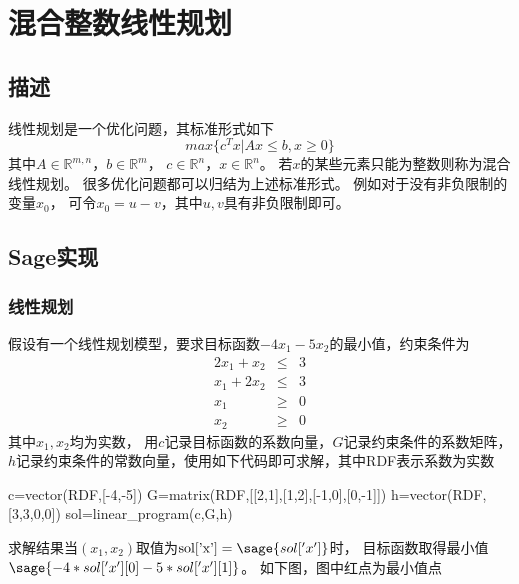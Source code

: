 \section{混合整数线性规划}
\subsection{描述}
线性规划是一个优化问题，其标准形式如下
\[max\{c^Tx|Ax\leq b,x\geq 0\}\]
其中$A\in\mathbb{R}^{m,n}$，$b\in\mathbb{R}^m$，
$c\in\mathbb{R}^n$，$x\in\mathbb{R}^n$。
若$x$的某些元素只能为整数则称为混合线性规划。
很多优化问题都可以归结为上述标准形式。
例如对于没有非负限制的变量$x_0$，
可令$x_0=u-v$，其中$u,v$具有非负限制即可。

\subsection{Sage实现}
\subsubsection{线性规划}
假设有一个线性规划模型，要求目标函数$-4x_1-5x_2$的最小值，约束条件为
\[
\begin{array}{rcl}
2x_1+x_2 &\leq& 3\\
x_1+2x_2 &\leq& 3\\
x_1 &\geq& 0\\
x_2 &\geq& 0
\end{array}
\]
其中$x_1,x_2$均为实数，
用$c$记录目标函数的系数向量，$G$记录约束条件的系数矩阵，
$h$记录约束条件的常数向量，使用如下代码即可求解，其中RDF表示系数为实数
\begin{sageblock}
c=vector(RDF,[-4,-5])
G=matrix(RDF,[[2,1],[1,2],[-1,0],[0,-1]])
h=vector(RDF,[3,3,0,0])
sol=linear_program(c,G,h)
\end{sageblock}
求解结果当$(x_1,x_2)$取值为$\textrm{sol['x']}=\sage{sol['x']}$时，
目标函数取得最小值$\sage{-4*sol['x'][0]-5*sol['x'][1]}$。
如下图，图中红点为最小值点


